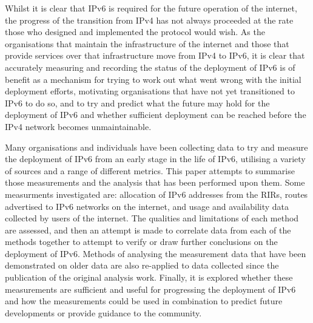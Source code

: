Whilst it is clear that IPv6 is required for the future operation of the
internet\cite{huston_ipv6_2008}, the progress of the transition from IPv4  has not always proceeded
at the rate those who designed and implemented the protocol would wish. As the
organisations that maintain the infrastructure of the internet and those that
provide services over that infrastructure move from IPv4 to IPv6, it is clear
that accurately measuring and recording the status of the deployment of IPv6
is of benefit as a mechanism for trying to work out what went wrong with
the initial deployment efforts, motivating organisations that have not yet
transitioned to IPv6 to do so, and to try and predict what the future may hold
for the deployment of IPv6 and whether sufficient deployment can be reached before
the IPv4 network becomes unmaintainable\cite{huston_primer_2013}.

Many organisations and individuals have been collecting data to try and measure
the deployment of IPv6 from an
early stage in the life of IPv6, utilising a variety of sources and a range of
different metrics. This paper attempts to summarise those measurements and
the analysis that has been performed upon them. Some measurments investigated
are: allocation of IPv6 addresses from the RIRs, routes advertised to IPv6
networks on the internet, and  
usage and availability data collected by users of the internet.
The qualities and limitations of each method are assessed, and then an attempt
is made to correlate data from each of the methods together to attempt to verify
or draw further conclusions on the deployment of IPv6. Methods of analysing the
measurement data that have been demonstrated on older data are 
also re-applied to data collected since the publication of the original
analysis work. Finally, it is explored whether these
measurements are sufficient and useful for progressing
the deployment of IPv6 and how the measurements could be used in combination to
predict future developments or provide guidance to the community.

